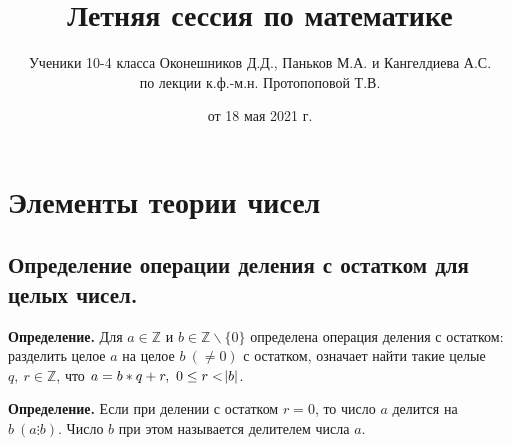 \documentclass{article}
\begin{document}
\title{Летняя сессия по математике}
    \author{Ученики 10-4 класса Оконешников Д.Д., Паньков М.А. и Кангелдиева А.С. \\по лекции к.ф.-м.н. Протопоповой Т.В.}
    \date{от 18 мая 2021 г.}
    \maketitle
	
    \tableofcontents
	\thispagestyle{empty}
	\setcounter{tocdepth}{5}
	\newpage
    
    \section{Элементы теории чисел}
    	\subsection{Определение операции деления с остатком для целых чисел.}
    		\textbf{Определение.} Для \( a \in \mathbb{Z} \) и \( b \in \mathbb{Z} \backslash \{0\} \) определена операция деления с остатком: разделить целое \( a \) на целое \(b\ (\neq 0) \) с остатком, 
			означает найти такие целые \( q,\ r \in \mathbb{Z} \), что \(a=b*q+r,\ 0 \leq r < \abs{b} \).
            
  			\textbf{Определение.} Если при делении с остатком \( r = 0 \), то число \( a \) делится на \( b\ (a \vdots b) \). Число \( b \) при этом называется делителем числа \( a \).	
            
\end{document}
